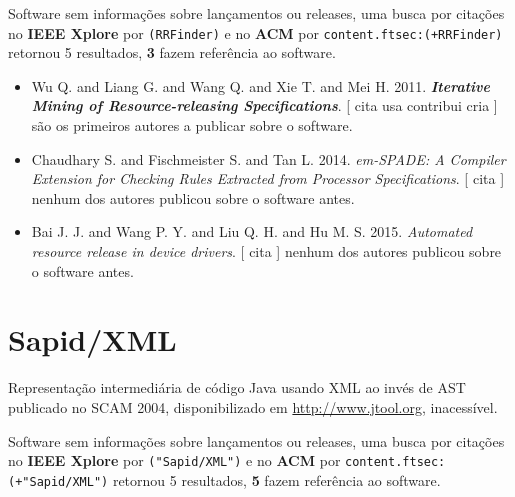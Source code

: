 Software sem informações sobre lançamentos ou releases,
uma busca por citações no {\bf IEEE Xplore} por
\texttt{(RRFinder)}
e no {\bf ACM} por
\texttt{content.ftsec:(+RRFinder)}
retornou
5 resultados,
{\bf 3} fazem referência ao software.

\begin{itemize}
\item Wu Q. and Liang G. and Wang Q. and Xie T. and Mei H.
      2011.
        \textbf{\textit{ Iterative Mining of Resource-releasing Specifications}}.
      [
          cita
          usa
          contribui
          cria
      ]
são os primeiros autores a publicar sobre o software.
\item Chaudhary S. and Fischmeister S. and Tan L.
      2014.
        \textit{ em-SPADE: A Compiler Extension for Checking Rules Extracted from Processor Specifications}.
      [
          cita
      ]
nenhum dos autores publicou sobre o software antes.
\item Bai J. J. and Wang P. Y. and Liu Q. H. and Hu M. S.
      2015.
        \textit{ Automated resource release in device drivers}.
      [
          cita
      ]
nenhum dos autores publicou sobre o software antes.
\end{itemize}
\section{Sapid/XML}

Representação intermediária de código Java usando XML ao invés de AST
publicado no SCAM 2004,
disponibilizado em \url{http://www.jtool.org},
inacessível.

Software sem informações sobre lançamentos ou releases,
uma busca por citações no {\bf IEEE Xplore} por
\texttt{("Sapid/XML")}
e no {\bf ACM} por
\texttt{content.ftsec:(+"Sapid/XML")}
retornou
5 resultados,
{\bf 5} fazem referência ao software.

